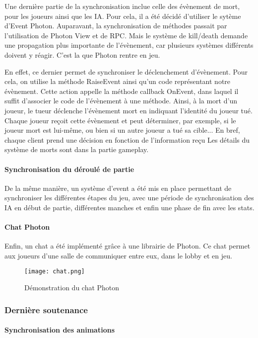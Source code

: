             Une dernière partie de la synchronisation inclue celle des évènement de mort, pour les joueurs ainsi
            que les IA. Pour cela, il a été décidé d'utiliser le sytème d'Event Photon. Auparavant, la synchronisation de méthodes
            passait par l'utilisation de Photon View et de RPC. Mais le système de kill/death demande une propagation plus importante
            de l'évènement, car plusieurs systèmes différents doivent y réagir. C'est la que Photon rentre en jeu.

            En effet, ce dernier permet de synchroniser le déclenchement d'évènement. Pour cela, on utilise la méthode RaiseEvent ainsi
            qu'un code représentant notre évènement. Cette action appelle la méthode callback OnEvent, dans laquel il suffit d'associer le
            code de l'évènement à une méthode. Ainsi, à la mort d'un joueur, le tueur déclenche l'évènement mort en indiquant l'identité du
            joueur tué. Chaque joueur reçoit cette évènement et peut déterminer, par exemple, si le joueur mort est lui-même, ou bien si un
            autre joueur a tué sa cible... En bref, chaque client prend une décision en fonction de l'information reçu
            Les détails du système de morts sont dans la partie gameplay.


        \paragraph{Synchronisation du déroulé de partie}
            De la même manière, un système d'event a été mis en place permettant de synchroniser les différentes étapes du jeu, 
            avec une période de synchronisation des IA en début de partie, différentes manches et enfin une phase de fin avec les stats.


        \paragraph{Chat Photon}

        Enfin, un chat a été implémenté grâce à une librairie de Photon. Ce chat permet aux joueurs 
        d'une salle de communiquer entre eux, dans le lobby et en jeu.

        \begin{figure}[hbt!]
            \centering
            \texttt{[image: chat.png]}
            \caption{Démonstration du chat Photon}
        \end{figure}


    \subsubsection{Dernière soutenance}

        \paragraph{Synchronisation des animations}


